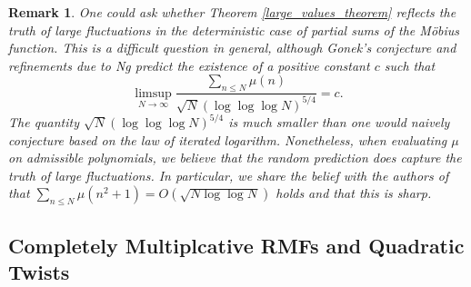 \documentclass[11pts]{amsart}
\numberwithin{equation}{section}
\newtheorem{rem}{Remark}[section]
\begin{document}
\begin{rem}
One could ask whether Theorem \ref{large_values_theorem} reflects the truth of large fluctuations in the deterministic case of partial sums of the M\"obius function. This is a difficult question in general, although Gonek's conjecture and refinements due to Ng \cite{Ng_2004} predict the existence of a positive constant $c$ such that 
\begin{equation}
    \limsup_{N\to\infty} \frac{\sum_{n\leq N}\mu(n)}{\sqrt{N}(\log\log\log N)^{5/4}} = c.
\end{equation}
The quantity $\sqrt{N}(\log\log\log N)^{5/4}$ is much smaller than one would naively conjecture based on the law of iterated logarithm. Nonetheless, when evaluating $\mu$ on admissible polynomials, we believe that the random prediction does capture the truth of large fluctuations. In particular, we share the belief with the authors of \cite{Oleksiy-RandomChowla} that $\sum_{n\leq N} \mu(n^2 + 1) = O(\sqrt{N\log\log N})$ holds and that this is sharp. 
\end{rem}

\subsection{Completely Multiplcative RMFs and Quadratic Twists}
\end{document}
